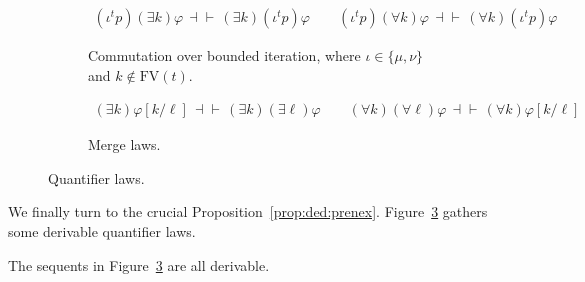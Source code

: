 \documentclass[%
  a4paper,
  UKenglish,
  cleveref,
  autoref,
  thm-restate,
  numberwithinsect,
]{lipics-v2021}
\newcommand\defthesisiff{\dashv\vdash}
\newcommand\thesisiff{\mathrel{\defthesisiff}}
\newcommand\FV{\mathrm{FV}}
\newcommand\itvar{k}
\newcommand\itvarbis{\ell}
\newcommand\FP{p}
\newcommand\finmu{\mu}
\newcommand\finnu{\nu}
\newcommand\fingen{\iota}
\begin{document}
\begin{figure}
\begin{subfigure}{\textwidth}
\centering
\(
\begin{array}{c}
%
 (\fingen^t \FP)(\exists \itvar)\varphi 
 \,\thesisiff\,
 (\exists \itvar)(\fingen^t \FP)\varphi
%
\qquad
%
 (\fingen^t \FP)(\forall \itvar)\varphi 
 \,\thesisiff\,
 (\forall \itvar)(\fingen^t \FP)\varphi
\end{array}
\)
\caption{Commutation over bounded iteration,
where $\fingen \in \{\finmu, \finnu\}$
and $\itvar \notin \FV(t)$.%
\label{fig:proof:log:der:quant:iter}}
\end{subfigure}

\begin{subfigure}{\textwidth}
\centering
\(
\begin{array}{c}
%
 (\exists \itvar)\varphi[\itvar / \itvarbis]
 \,\thesisiff\,
 (\exists \itvar)(\exists \itvarbis)\varphi
%
\qquad
%
 (\forall \itvar)(\forall \itvarbis)\varphi 
 \,\thesisiff\,
 (\forall \itvar)\varphi[\itvar / \itvarbis]
\end{array}
\)
\caption{Merge laws.%
\label{fig:proof:log:der:quant:merge}}
\end{subfigure}


\caption{Quantifier laws.%
\label{fig:proof:log:der:quant}}
\end{figure}


We finally turn to the crucial Proposition~\ref{prop:ded:prenex}.
Figure~\ref{fig:proof:log:der:quant} gathers some derivable
quantifier laws.

\begin{lemma}
\label{lem:proof:log:der:quand}
The sequents in Figure~\ref{fig:proof:log:der:quant} are all derivable.
\end{lemma}
\end{document}
